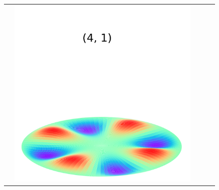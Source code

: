 \documentclass[a4paper]{ctexart}
\begin{document}
\begin{figure}[htbp]
\begin{tabular}{ccccc}
			& \includegraphics[scale=0.4]{4_1.png} \\

\end{tabular}
\end{figure}
\end{document}
